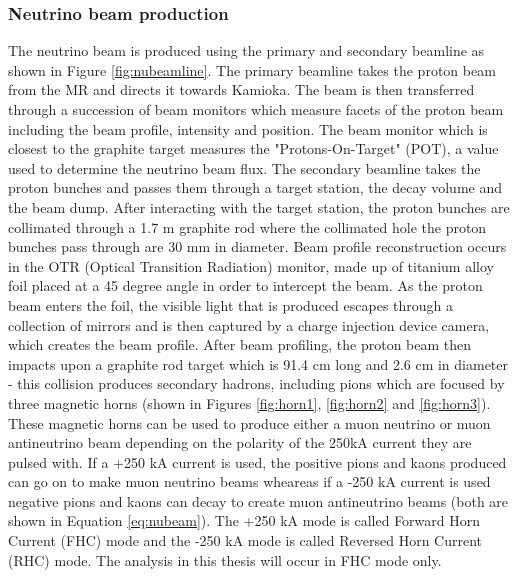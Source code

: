 \subsubsection{Neutrino beam production}

The neutrino beam is produced using the primary and secondary beamline as shown in Figure \ref{fig:nubeamline}. The primary beamline takes the proton beam from the MR and directs it towards Kamioka. The beam is then transferred through a succession of beam monitors which measure facets of the proton beam including the beam profile, intensity and position. The beam monitor which is closest to the graphite target measures the "Protons-On-Target" (POT), a value used to determine the neutrino beam flux. The secondary beamline takes the proton bunches and passes them through a target station, the decay volume and the beam dump. After interacting with the target station, the proton bunches are collimated through a 1.7 m graphite rod where the collimated hole the proton bunches pass through are 30 mm in diameter. Beam profile reconstruction occurs in the OTR (Optical Transition Radiation) monitor, made up of titanium alloy foil placed at a 45 degree angle in order to intercept the beam. As the proton beam enters the foil, the visible light that is produced escapes through a collection of mirrors and is then captured by a charge injection device camera, which creates the beam profile. 
\newline
After beam profiling, the proton beam then impacts upon a graphite rod target which is 91.4 cm long and 2.6 cm in diameter - this collision produces secondary hadrons, including pions which are focused by three magnetic horns (shown in Figures \ref{fig:horn1}, \ref{fig:horn2} and \ref{fig:horn3}). These magnetic horns can be used to produce either a muon neutrino or muon antineutrino beam depending on the polarity of the 250kA current they are pulsed with. If a +250 kA current is used, the positive pions and kaons produced can go on to make muon neutrino beams wheareas if a -250 kA current is used negative pions and kaons can decay to create muon antineutrino beams (both are shown in Equation \ref{eq:nubeam}). The +250 kA mode is called Forward Horn Current (FHC) mode and the -250 kA mode is called Reversed Horn Current (RHC) mode. The analysis in this thesis will occur in FHC mode only. 


